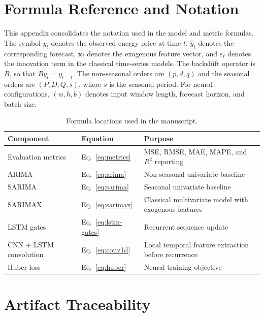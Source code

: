 \documentclass[11pt,a4paper]{article}
\begin{document}
\begin{appendices}

\section{Formula Reference and Notation}\label{app:formula-reference}

This appendix consolidates the notation used in the model and metric formulas. The symbol $y_t$ denotes the observed energy price at time $t$, $\hat{y}_t$ denotes the corresponding forecast, $\mathbf{x}_t$ denotes the exogenous feature vector, and $\varepsilon_t$ denotes the innovation term in the classical time-series models. The backshift operator is $B$, so that $By_t=y_{t-1}$. The non-seasonal orders are $(p,d,q)$ and the seasonal orders are $(P,D,Q,s)$, where $s$ is the seasonal period. For neural configurations, $(w,h,b)$ denotes input window length, forecast horizon, and batch size.

\begin{table}[h!]
\centering
\caption{Formula locations used in the manuscript.}\label{tab:formula-reference}
\small
\begin{tabular}{@{}lll@{}}
\toprule
Component & Equation & Purpose\\
\midrule
Evaluation metrics & Eq.~\eqref{eq:metrics} & MSE, RMSE, MAE, MAPE, and $R^2$ reporting\\
ARIMA & Eq.~\eqref{eq:arima} & Non-seasonal univariate baseline\\
SARIMA & Eq.~\eqref{eq:sarima} & Seasonal univariate baseline\\
SARIMAX & Eq.~\eqref{eq:sarimax} & Classical multivariate model with exogenous features\\
LSTM gates & Eq.~\eqref{eq:lstm-gates} & Recurrent sequence update\\
CNN + LSTM convolution & Eq.~\eqref{eq:conv1d} & Local temporal feature extraction before recurrence\\
Huber loss & Eq.~\eqref{eq:huber} & Neural training objective\\
\bottomrule
\end{tabular}
\end{table}

\section{Artifact Traceability}\label{app:artifact-traceability}


\end{appendices}
\end{document}

